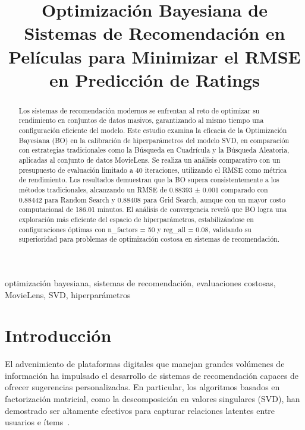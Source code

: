 \documentclass[conference]{IEEEtran}
\begin{document}
\title{Optimización Bayesiana de Sistemas de Recomendación en Películas para Minimizar el RMSE en Predicción de Ratings}

\author{
}

\maketitle

\begin{abstract}
Los sistemas de recomendación modernos se enfrentan al reto de optimizar su rendimiento en conjuntos de datos masivos, garantizando al mismo tiempo una configuración eficiente del modelo. Este estudio examina la eficacia de la Optimización Bayesiana (BO) en la calibración de hiperparámetros del modelo SVD, en comparación con estrategias tradicionales como la Búsqueda en Cuadrícula y la Búsqueda Aleatoria, aplicadas al conjunto de datos MovieLens. Se realiza un análisis comparativo con un presupuesto de evaluación limitado a 40 iteraciones, utilizando el RMSE como métrica de rendimiento. Los resultados demuestran que la BO supera consistentemente a los métodos tradicionales, alcanzando un RMSE de 0.88393 ± 0.001 comparado con 0.88442 para Random Search y 0.88408 para Grid Search, aunque con un mayor costo computacional de 186.01 minutos. El análisis de convergencia reveló que BO logra una exploración más eficiente del espacio de hiperparámetros, estabilizándose en configuraciones óptimas con n\_factors = 50 y reg\_all = 0.08, validando su superioridad para problemas de optimización costosa en sistemas de recomendación.
\end{abstract}

\begin{IEEEkeywords}
optimización bayesiana, sistemas de recomendación, evaluaciones costosas, MovieLens, SVD, hiperparámetros
\end{IEEEkeywords}

\section{Introducción}

El advenimiento de plataformas digitales que manejan grandes volúmenes de información ha impulsado el desarrollo de sistemas de recomendación capaces de ofrecer sugerencias personalizadas. En particular, los algoritmos basados en factorización matricial, como la descomposición en valores singulares (SVD), han demostrado ser altamente efectivos para capturar relaciones latentes entre usuarios e ítems~\cite{b1}.
\end{document}
